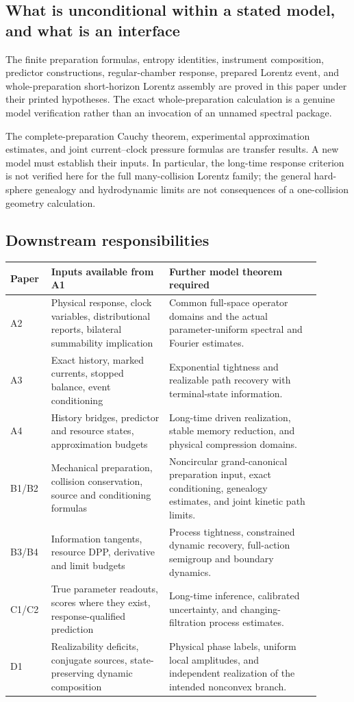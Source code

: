 \subsection{What is unconditional within a stated model, and what is an interface}
The finite preparation formulas, entropy identities, instrument composition, predictor constructions, regular-chamber response, prepared Lorentz event, and whole-preparation short-horizon Lorentz assembly are proved in this paper under their printed hypotheses. The exact whole-preparation calculation is a genuine model verification rather than an invocation of an unnamed spectral package.

The complete-preparation Cauchy theorem, experimental approximation estimates, and joint current--clock pressure formulas are transfer results. A new model must establish their inputs. In particular, the long-time response criterion is not verified here for the full many-collision Lorentz family; the general hard-sphere genealogy and hydrodynamic limits are not consequences of a one-collision geometry calculation.

\subsection{Downstream responsibilities}
\begin{longtable}{>{\raggedright\arraybackslash}p{0.10\linewidth}>{\raggedright\arraybackslash}p{0.35\linewidth}>{\raggedright\arraybackslash}p{0.45\linewidth}}
\toprule
Paper & Inputs available from A1 & Further model theorem required\\\midrule\endhead
A2 & Physical response, clock variables, distributional reports, bilateral summability implication & Common full-space operator domains and the actual parameter-uniform spectral and Fourier estimates.\\
A3 & Exact history, marked currents, stopped balance, event conditioning & Exponential tightness and realizable path recovery with terminal-state information.\\
A4 & History bridges, predictor and resource states, approximation budgets & Long-time driven realization, stable memory reduction, and physical compression domains.\\
B1/B2 & Mechanical preparation, collision conservation, source and conditioning formulas & Noncircular grand-canonical preparation input, exact conditioning, genealogy estimates, and joint kinetic path limits.\\
B3/B4 & Information tangents, resource DPP, derivative and limit budgets & Process tightness, constrained dynamic recovery, full-action semigroup and boundary dynamics.\\
C1/C2 & True parameter readouts, scores where they exist, response-qualified prediction & Long-time inference, calibrated uncertainty, and changing-filtration process estimates.\\
D1 & Realizability deficits, conjugate sources, state-preserving dynamic composition & Physical phase labels, uniform local amplitudes, and independent realization of the intended nonconvex branch.\\\bottomrule
\end{longtable}

